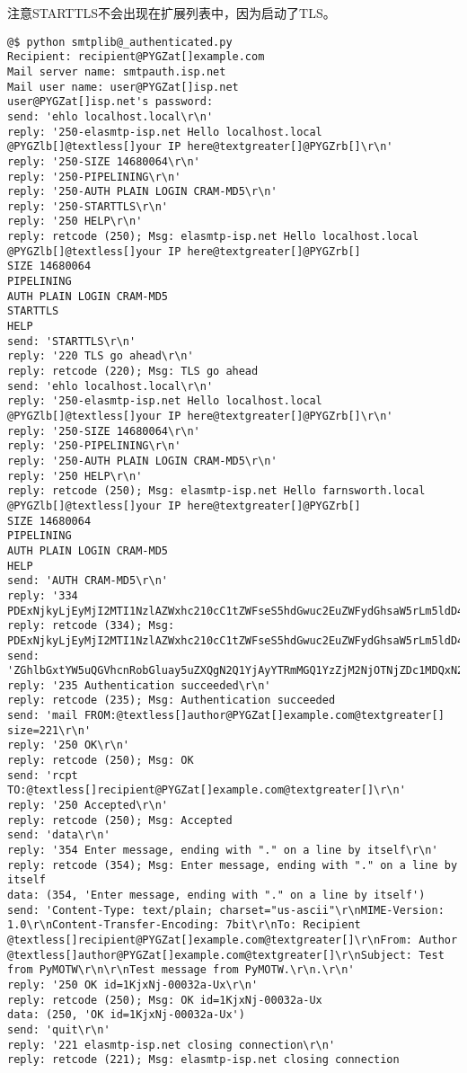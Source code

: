 \documentclass[letterpaper,10pt,english]{manual}
\begin{document}
注意STARTTLS不会出现在扩展列表中，因为启动了TLS。

\begin{Verbatim}[commandchars=@\[\]]
@$ python smtplib@_authenticated.py
Recipient: recipient@PYGZat[]example.com
Mail server name: smtpauth.isp.net
Mail user name: user@PYGZat[]isp.net
user@PYGZat[]isp.net's password:
send: 'ehlo localhost.local\r\n'
reply: '250-elasmtp-isp.net Hello localhost.local @PYGZlb[]@textless[]your IP here@textgreater[]@PYGZrb[]\r\n'
reply: '250-SIZE 14680064\r\n'
reply: '250-PIPELINING\r\n'
reply: '250-AUTH PLAIN LOGIN CRAM-MD5\r\n'
reply: '250-STARTTLS\r\n'
reply: '250 HELP\r\n'
reply: retcode (250); Msg: elasmtp-isp.net Hello localhost.local @PYGZlb[]@textless[]your IP here@textgreater[]@PYGZrb[]
SIZE 14680064
PIPELINING
AUTH PLAIN LOGIN CRAM-MD5
STARTTLS
HELP
send: 'STARTTLS\r\n'
reply: '220 TLS go ahead\r\n'
reply: retcode (220); Msg: TLS go ahead
send: 'ehlo localhost.local\r\n'
reply: '250-elasmtp-isp.net Hello localhost.local @PYGZlb[]@textless[]your IP here@textgreater[]@PYGZrb[]\r\n'
reply: '250-SIZE 14680064\r\n'
reply: '250-PIPELINING\r\n'
reply: '250-AUTH PLAIN LOGIN CRAM-MD5\r\n'
reply: '250 HELP\r\n'
reply: retcode (250); Msg: elasmtp-isp.net Hello farnsworth.local @PYGZlb[]@textless[]your IP here@textgreater[]@PYGZrb[]
SIZE 14680064
PIPELINING
AUTH PLAIN LOGIN CRAM-MD5
HELP
send: 'AUTH CRAM-MD5\r\n'
reply: '334 PDExNjkyLjEyMjI2MTI1NzlAZWxhc210cC1tZWFseS5hdGwuc2EuZWFydGhsaW5rLm5ldD4=\r\n'
reply: retcode (334); Msg: PDExNjkyLjEyMjI2MTI1NzlAZWxhc210cC1tZWFseS5hdGwuc2EuZWFydGhsaW5rLm5ldD4=
send: 'ZGhlbGxtYW5uQGVhcnRobGluay5uZXQgN2Q1YjAyYTRmMGQ1YzZjM2NjOTNjZDc1MDQxN2ViYjg=\r\n'
reply: '235 Authentication succeeded\r\n'
reply: retcode (235); Msg: Authentication succeeded
send: 'mail FROM:@textless[]author@PYGZat[]example.com@textgreater[] size=221\r\n'
reply: '250 OK\r\n'
reply: retcode (250); Msg: OK
send: 'rcpt TO:@textless[]recipient@PYGZat[]example.com@textgreater[]\r\n'
reply: '250 Accepted\r\n'
reply: retcode (250); Msg: Accepted
send: 'data\r\n'
reply: '354 Enter message, ending with "." on a line by itself\r\n'
reply: retcode (354); Msg: Enter message, ending with "." on a line by itself
data: (354, 'Enter message, ending with "." on a line by itself')
send: 'Content-Type: text/plain; charset="us-ascii"\r\nMIME-Version: 1.0\r\nContent-Transfer-Encoding: 7bit\r\nTo: Recipient @textless[]recipient@PYGZat[]example.com@textgreater[]\r\nFrom: Author @textless[]author@PYGZat[]example.com@textgreater[]\r\nSubject: Test from PyMOTW\r\n\r\nTest message from PyMOTW.\r\n.\r\n'
reply: '250 OK id=1KjxNj-00032a-Ux\r\n'
reply: retcode (250); Msg: OK id=1KjxNj-00032a-Ux
data: (250, 'OK id=1KjxNj-00032a-Ux')
send: 'quit\r\n'
reply: '221 elasmtp-isp.net closing connection\r\n'
reply: retcode (221); Msg: elasmtp-isp.net closing connection
\end{Verbatim}
\end{document}
